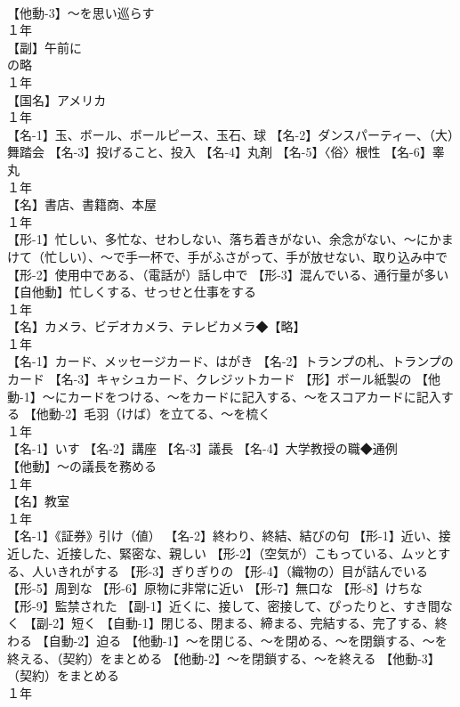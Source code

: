 \documentclass[8pt]{extreport}
\begin{document}
\begin{CJK}{UTF8}{min}
\\	【他動-3】～を思い巡らす
\\	１年	
\\	【副】午前に
\\	の略
\\	１年	
\\	【国名】アメリカ
\\	１年	
\\	【名-1】玉、ボール、ボールピース、玉石、球 【名-2】ダンスパーティー、（大）舞踏会 【名-3】投げること、投入 【名-4】丸剤 【名-5】〈俗〉根性 【名-6】睾丸
\\	１年	
\\	【名】書店、書籍商、本屋
\\	１年	
\\	【形-1】忙しい、多忙な、せわしない、落ち着きがない、余念がない、～にかまけて（忙しい）、～で手一杯で、手がふさがって、手が放せない、取り込み中で 【形-2】使用中である、（電話が）話し中で 【形-3】混んでいる、通行量が多い 【自他動】忙しくする、せっせと仕事をする
\\	１年	
\\	【名】カメラ、ビデオカメラ、テレビカメラ◆【略】
\\	１年	
\\	【名-1】カード、メッセージカード、はがき 【名-2】トランプの札、トランプのカード 【名-3】キャシュカード、クレジットカード 【形】ボール紙製の 【他動-1】～にカードをつける、～をカードに記入する、～をスコアカードに記入する 【他動-2】毛羽（けば）を立てる、～を梳く
\\	１年	
\\	【名-1】いす 【名-2】講座 【名-3】議長 【名-4】大学教授の職◆通例 
\\	【他動】～の議長を務める
\\	１年	
\\	【名】教室
\\	１年	
\\	【名-1】《証券》引け（値） 【名-2】終わり、終結、結びの句 【形-1】近い、接近した、近接した、緊密な、親しい 【形-2】（空気が）こもっている、ムッとする、人いきれがする 【形-3】ぎりぎりの 【形-4】（織物の）目が詰んでいる 【形-5】周到な 【形-6】原物に非常に近い 【形-7】無口な 【形-8】けちな 【形-9】監禁された 【副-1】近くに、接して、密接して、ぴったりと、すき間なく 【副-2】短く 【自動-1】閉じる、閉まる、締まる、完結する、完了する、終わる 【自動-2】迫る 【他動-1】～を閉じる、～を閉める、～を閉鎖する、～を終える、（契約）をまとめる 【他動-2】～を閉鎖する、～を終える 【他動-3】（契約）をまとめる
\\	１年	

\end{CJK}
\end{document}
